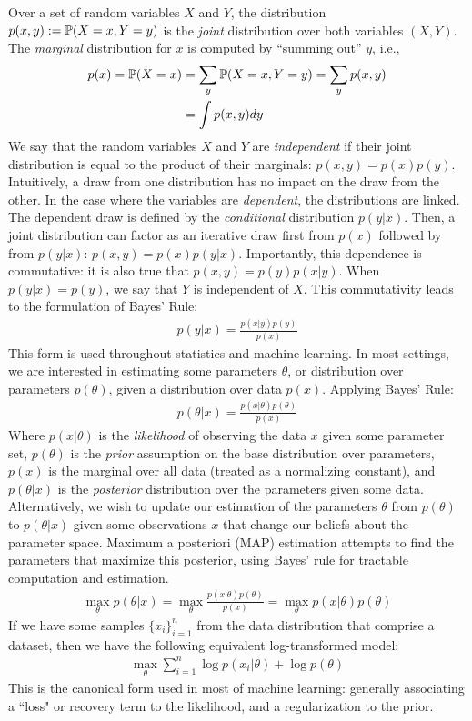 Over a set of random variables $X$ and $Y$, the distribution $p(x,y):= \mathbb{P}(X=x,Y=y)$ is the \textit{joint} distribution over both variables $(X,Y)$. The \textit{marginal} distribution for $x$ is computed by ``summing out'' $y$, i.e.,
\begin{align}
p(x) = \mathbb{P}(X=x) &= \sum_y \mathbb{P}(X=x,Y=y) = \sum_y p(x,y) \\
&= \int p(x,y) dy
\end{align}
We say that the random variables $X$ and $Y$ are \textit{independent}
if their joint distribution is equal to the product of their marginals: $p(x,y) = p(x)p(y)$.
Intuitively, a draw from one distribution has no impact on the draw from the other.
In the case where the variables are \textit{dependent}, the distributions are linked.
The dependent draw is defined by the \textit{conditional} distribution $p(y|x)$.
Then, a joint distribution can factor as
an iterative draw first from $p(x)$ followed by from $p(y|x)$: $p(x,y) = p(x)p(y|x)$.
Importantly, this dependence is commutative:
it is also true that $p(x,y) = p(y)p(x|y)$.
When $p(y|x) = p(y)$, we say that $Y$ is independent of $X$.
This commutativity leads to the formulation of Bayes' Rule:
\begin{align}
    p(y|x) = \frac{p(x|y)p(y)}{p(x)}
\end{align}
This form is used throughout statistics and machine learning.
In most settings, we are interested in estimating some parameters $\theta$,
or distribution over parameters $p(\theta)$, given a distribution over data $p(x)$.
Applying Bayes' Rule:
\begin{align}
    p(\theta|x) = \frac{p(x|\theta)p(\theta)}{p(x)}
\end{align}
Where $p(x|\theta)$ is the \textit{likelihood} of observing the data $x$ given some parameter set,
$p(\theta)$ is the \textit{prior} assumption on the base distribution over parameters,
$p(x)$ is the marginal over all data (treated as a normalizing constant),
and $p(\theta|x)$ is the \textit{posterior} distribution over the parameters given some data.
Alternatively, we wish to update our estimation of the parameters $\theta$
from $p(\theta)$ to $p(\theta|x)$ given some observations $x$ that change our beliefs about the parameter space.
Maximum a posteriori (MAP) estimation attempts
to find the parameters that maximize this posterior,
using Bayes' rule for tractable computation and estimation.
\begin{align}\label{eq:map}
	\max_\theta p(\theta|x) = \max_\theta \frac{p(x|\theta)p(\theta)}{p(x)} =  \max_\theta p(x|\theta)p(\theta)
\end{align}
If we have some samples $\{x_i\}_{i=1}^n$ from the data distribution that comprise a dataset,
then we have the following equivalent log-transformed model:
\begin{align}
	\max_\theta \sum_{i=1}^n \log p(x_i|\theta) + \log p(\theta)
\end{align}
This is the canonical form used in most of machine learning:
generally associating a ``loss" or recovery term to the likelihood,
and a regularization to the prior.


